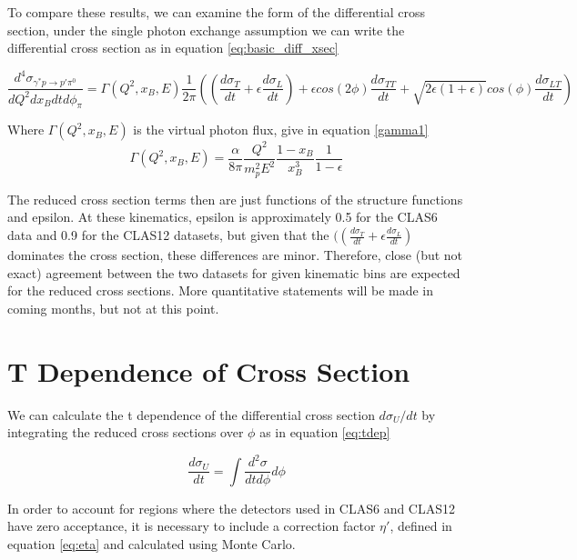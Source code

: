 To compare these results, we can examine the form of the differential cross section, under the single photon exchange assumption we can write the differential cross section as in equation \ref{eq:basic_diff_xsec}

 \begin{equation}\label{dif1}
     \frac{d^4\sigma_{\gamma^*p \rightarrow p'\pi^0}}{dQ^2dx_Bdtd\phi_{\pi}} =
     \Gamma (Q^2, x_B, E)
     \frac{1}{2\pi}
     ((\frac{d\sigma_T}{dt}+\epsilon\frac{d\sigma_L}{dt})+
     \epsilon cos(2\phi) \frac{d\sigma_{TT}}{dt} + \sqrt{2\epsilon(1+\epsilon)}cos(\phi)\frac{d\sigma_{LT}}{dt})
\end{equation}

Where $\Gamma (Q^2, x_B, E)$ is the virtual photon flux, give in equation \ref{gamma1}
 \begin{equation}\label{gamma1}
            \Gamma (Q^2, x_B, E) = \frac{\alpha}{8\pi} \frac{Q^2}{m^2_pE^2}\frac{1-x_B}{x_B^3}\frac{1}{1-\epsilon}
\end{equation}

The reduced cross section terms then are just functions of the structure functions and epsilon. At these kinematics, epsilon is approximately 0.5 for the CLAS6 data and 0.9 for the CLAS12 datasets, but given that the $((\frac{d\sigma_T}{dt}+\epsilon\frac{d\sigma_L}{dt})$ dominates the cross section, these differences are minor. Therefore, close (but not exact) agreement between the two datasets for given kinematic bins are expected for the reduced cross sections. More quantitative statements will be made in coming months, but not at this point.


\section{T Dependence of Cross Section}

We can calculate the t dependence of the differential cross section $d\sigma_U/dt$ by integrating the reduced cross sections over $\phi$ as in equation \ref{eq:tdep}

 \begin{equation}\label{eq:tdep}
    \frac{d\sigma_U}{dt} = \int \frac{d^2\sigma}{dtd\phi} d\phi
\end{equation}

In order to account for regions where the detectors used in CLAS6 and CLAS12 have zero acceptance, it is necessary to include a correction factor $\eta'$, defined in equation \ref{eq:eta} and calculated using Monte Carlo. 

